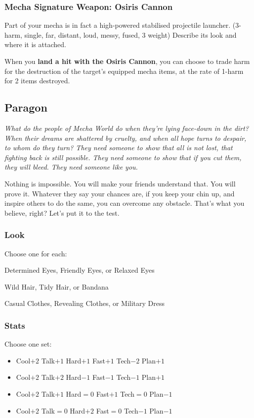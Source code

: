 \subsubsection{Mecha Signature Weapon: Osiris Cannon}
Part of your mecha is in fact a high-powered stabilised projectile launcher. (3-harm, single, far, distant, loud, messy, fused, 3 weight) Describe its look and where it is attached.

When you \textbf{land a hit with the Osiris Cannon}, you can choose to trade harm for the destruction of the target's equipped mecha items, at the rate of 1-harm for 2 items destroyed.




\subsection{Paragon}

{\itshape What do the people of Mecha World do when they're lying
  face-down in the dirt? When their dreams are shattered by cruelty,
  and when all hope turns to despair, to whom do they turn? They need
  someone to show that all is not lost, that fighting back is still
  possible. They need someone to show that if you cut them, they
  \emph{will} bleed. They need someone like you.

Nothing is impossible. You will make your friends understand that. You
will prove it. Whatever they say your chances are, if you keep your
chin up, and inspire others to do the same, you can overcome any
obstacle. That's what you believe, right? Let's put it to the test.}

\subsubsection{Look}
Choose one for each:

Determined Eyes, Friendly Eyes, or Relaxed Eyes

Wild Hair, Tidy Hair, or Bandana

Casual Clothes, Revealing Clothes, or Military Dress

\subsubsection{Stats}
Choose one set:
\begin{itemize}
\setlength\itemsep{0em}
\item Cool$+2$ Talk$+1$ Hard$+1$ Fast$+1$ Tech$-2$ Plan$+1$
\item Cool$+2$ Talk$+2$ Hard$-1$ Fast$-1$ Tech$-1$ Plan$+1$
\item Cool$+2$ Talk$+1$ Hard${=}0$ Fast$+1$ Tech${=}0$ Plan$-1$
\item Cool$+2$ Talk${=}0$ Hard$+2$ Fast${=}0$ Tech$-1$ Plan$-1$
\end{itemize}

